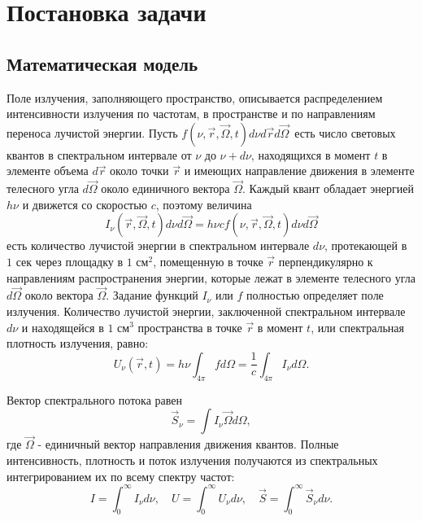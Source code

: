 \chapter{Постановка задачи}

\section{Математическая модель}
Поле излучения, заполняющего пространство, описывается распределением интенсивности излучения по частотам, в пространстве и по направлениям переноса лучистой энергии. Пусть $f(\nu, \vec r, \vec \Omega, t)d\nu d\vec r d \vec \Omega \, $ есть число световых квантов в спектральном интервале от $ \nu$ до $ \nu + d\nu$, находящихся в момент $t$ в элементе объема $d\vec r$ около точки $\vec r$ и имеющих направление движения в элементе телесного угла $d\vec \Omega$ около единичного вектора $\vec \Omega$. 
Каждый квант обладает энергией $h \nu$ и движется со скоростью $c$, поэтому величина 
\begin {equation}
I_{\nu} (\vec r, \vec \Omega, t)d \nu d\vec \Omega = h\nu c f (\nu, \vec r, \vec \Omega, t)d\nu d\vec{\Omega}
\end {equation}
есть количество лучистой энергии в спектральном интервале $d\nu$, протекающей в $1 \text{ сек}$ через площадку в $1 \text{ см}^2$, помещенную в точке $\vec r$ перпендикулярно к направлениям распространения энергии, которые лежат в элементе телесного угла $d\vec\Omega$ около вектора $\vec \Omega$. Задание функций $I_{\nu}$ или $f$ полностью определяет поле излучения. Количество лучистой энергии, заключенной  спектральном интервале $d\nu$ и находящейся в $1 \text{ см}^3$ пространства в точке $\vec r$ в момент $t$, или спектральная плотность излучения, равно:
\begin {equation}
U_\nu (\vec r, t) = h \nu \int_{4 \pi} f d \Omega = \frac{1}{c} \int_{4\pi} I_{\nu} d\Omega.
\end {equation}

Вектор спектрального потока равен 
\begin {equation}
\vec S_{\nu} = \int I_{\nu}\vec\Omega d\Omega,
\end {equation}
где $\vec\Omega$ - единичный вектор направления движения квантов. 
Полные интенсивность, плотность и поток излучения получаются из спектральных интегрированием их по всему спектру частот:
\begin {equation}
I = \int_0^\infty I_{\nu} d\nu, \quad U = \int_0^\infty U_{\nu}d\nu, \quad \vec S =  \int_0^\infty \vec S_{\nu}d\nu.
\end {equation}

